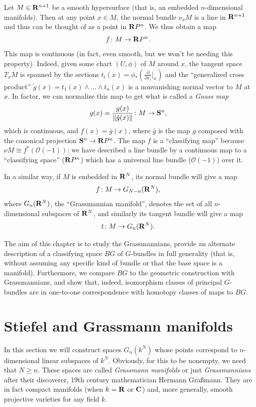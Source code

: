 \documentclass[a4paper,openany]{scrbook}
\begin{document}
Let $M \in \R^{n+1}$ be a smooth hypersurface (that is, an embedded $n$-dimensional manifolds). Then at any point $x \in M$, the normal bundle $\nu_x M$ is a line in $\R^{n+1}$ and thus can be thought of as a point in $\R P^n$. We thus obtain a map
\[
f\colon M \to \R P^n.
\]
This map is continuous (in fact, even smooth, but we won't be needing this property). Indeed, given some chart $(U,\phi)$ of $M$ around $x$, the tangent space $T_xM$ is spanned by the sections $t_i(x) = \phi_*(\frac{\partial}{\partial x_i}|_x)$ and the ``generalized cross product'' $\tilde g(x) = t_1(x) \wedge \dots \wedge t_n(x)$ is a nonvanishing normal vector to $M$ at $x$. In factor, we can normalize this map to get what is called a \emph{Gauss map}
\[
g(x) = \frac{g(x)}{\|\tilde g(x)\|} \colon M \to \S^n,
\]
which is continuous, and $f(x) = \bar g(x)$, where $\bar g$ is the map $g$ composed with the canonical projection $\S^n \to \R P^n$. The map $f$ is a ``classifying map'' because $\nu M \cong f^*(\mathcal O(-1))$: we have described a line bundle by a continuous map to a ``classifying space'' ($\R P^n$) which has a universal line bundle ($\mathcal O(-1)$) over it.

In a similar way, if $M$ is embedded in $\R^N$, its normal bundle will give a map
\[
f\colon M \to G_{N-n}(\R^N),
\]
where $G_n(\R^N)$, the ``Grassmannian manifold'', denotes the set of all $n$-dimensional subspaces of $\R^N$, and similarly its tangent bundle will give a map
\[
t\colon M \to G_n(\R^N).
\]

The aim of this chapter is to study the Grassmannians, provide an alternate description of a classifying space $BG$ of $G$-bundles in full generality (that is, without assuming any specific kind of bundle or that the base space is a manifold). Furthermore, we compare $BG$ to the geometric construction with Grassmannians, and show that, indeed, isomorphism classes of principal $G$-bundles are in one-to-one correspondence with homotopy classes of maps to $BG$.

\section{Stiefel and Grassmann manifolds}

In this section we will construct spaces $G_n(k^N)$ whose points correspond to $n$-dimensional linear subspaces of $k^N$. Obviously, for this to be nonempty, we need that $N \geq n$. These spaces are called \emph{Grassmann manifolds} or just \emph{Grassmannians} after their discoverer, 19th century mathematician Hermann Graßmann. They are in fact compact manifolds (when $k=\R$ or $\CC$) and, more generally, smooth projective varieties for any field $k$.
\end{document}
